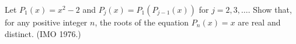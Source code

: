 Let $P_1(x) = x^2 - 2$ and $P_j(x) = P_1\left(P_{j-1}(x)\right)$ for $j = 2, 3, \ldots$. Show that, for any positive integer $n$, the roots of the equation $P_n(x) = x$ are real and distinct. (IMO 1976.)
